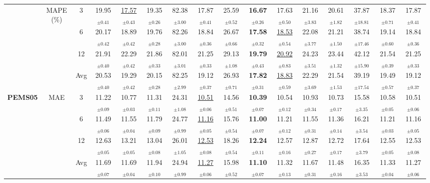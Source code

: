 \begin{table}[t]
{\begin{tabular}{ccc|ccc|cccc|cccc|cc}
\cmidrule(lr){2-16}
 & \multirow{4}{*}{MAPE (\%)} & 3 & 19.95$_{\pm0.41}$ & \underline{17.57$_{\pm0.43}$} & 19.35$_{\pm0.26}$ & 82.38$_{\pm3.00}$ & 17.87$_{\pm0.41}$ & 25.59$_{\pm0.52}$ & \textbf{16.67$_{\pm0.26}$} & 17.63$_{\pm0.50}$ & 21.16$_{\pm3.83}$ & 20.61$_{\pm1.82}$ & 37.87$_{\pm18.81}$ & 18.37$_{\pm0.71}$ & 17.87$_{\pm0.41}$ \\
 &  & 6 & 20.17$_{\pm0.42}$ & 18.89$_{\pm0.42}$ & 19.76$_{\pm0.28}$ & 82.26$_{\pm3.00}$ & 18.84$_{\pm0.36}$ & 26.67$_{\pm0.66}$ & \textbf{17.58$_{\pm0.32}$} & \underline{18.53$_{\pm0.54}$} & 22.08$_{\pm3.77}$ & 21.21$_{\pm1.50}$ & 38.74$_{\pm17.46}$ & 19.14$_{\pm0.60}$ & 18.84$_{\pm0.36}$ \\
 &  & 12 & 21.91$_{\pm0.40}$ & 22.29$_{\pm0.42}$ & 21.86$_{\pm0.33}$ & 82.01$_{\pm3.01}$ & 21.25$_{\pm0.33}$ & 29.13$_{\pm1.08}$ & \textbf{19.79$_{\pm0.43}$} & \underline{20.92$_{\pm0.83}$} & 24.23$_{\pm3.51}$ & 23.44$_{\pm1.32}$ & 42.12$_{\pm15.90}$ & 21.54$_{\pm0.39}$ & 21.25$_{\pm0.33}$ \\
 &  & Avg & 20.53$_{\pm0.40}$ & 19.29$_{\pm0.42}$ & 20.15$_{\pm0.28}$ & 82.25$_{\pm2.99}$ & 19.12$_{\pm0.37}$ & 26.93$_{\pm0.71}$ & \textbf{17.82$_{\pm0.31}$} & \underline{18.83$_{\pm0.59}$} & 22.29$_{\pm3.69}$ & 21.54$_{\pm1.53}$ & 39.19$_{\pm17.54}$ & 19.49$_{\pm0.57}$ & 19.12$_{\pm0.37}$ \\
\midrule
\multirow{12}{*}{\textbf{PEMS05}} & \multirow{4}{*}{MAE} & 3 & 11.22$_{\pm0.09}$ & 10.77$_{\pm0.03}$ & 11.31$_{\pm0.11}$ & 24.31$_{\pm1.08}$ & \underline{10.51$_{\pm0.06}$} & 14.56$_{\pm0.51}$ & \textbf{10.39$_{\pm0.07}$} & 10.54$_{\pm0.12}$ & 10.93$_{\pm0.34}$ & 10.73$_{\pm0.17}$ & 15.58$_{\pm3.35}$ & 10.58$_{\pm0.05}$ & 10.51$_{\pm0.06}$ \\
 &  & 6 & 11.49$_{\pm0.06}$ & 11.55$_{\pm0.04}$ & 11.79$_{\pm0.09}$ & 24.77$_{\pm0.99}$ & \underline{11.16$_{\pm0.05}$} & 15.76$_{\pm0.54}$ & \textbf{11.00$_{\pm0.07}$} & 11.21$_{\pm0.12}$ & 11.55$_{\pm0.31}$ & 11.36$_{\pm0.14}$ & 16.21$_{\pm3.54}$ & 11.21$_{\pm0.03}$ & 11.16$_{\pm0.05}$ \\
 &  & 12 & 12.63$_{\pm0.05}$ & 13.21$_{\pm0.05}$ & 13.04$_{\pm0.08}$ & 26.01$_{\pm1.05}$ & \underline{12.53$_{\pm0.08}$} & 18.26$_{\pm0.54}$ & \textbf{12.24$_{\pm0.11}$} & 12.57$_{\pm0.16}$ & 12.87$_{\pm0.27}$ & 12.72$_{\pm0.17}$ & 17.64$_{\pm3.79}$ & 12.55$_{\pm0.05}$ & 12.53$_{\pm0.08}$ \\
 &  & Avg & 11.69$_{\pm0.07}$ & 11.69$_{\pm0.04}$ & 11.94$_{\pm0.10}$ & 24.94$_{\pm0.99}$ & \underline{11.27$_{\pm0.06}$} & 15.98$_{\pm0.52}$ & \textbf{11.10$_{\pm0.07}$} & 11.32$_{\pm0.13}$ & 11.67$_{\pm0.31}$ & 11.48$_{\pm0.16}$ & 16.35$_{\pm3.53}$ & 11.33$_{\pm0.04}$ & 11.27$_{\pm0.06}$ \\

\end{tabular}}
\end{table}

